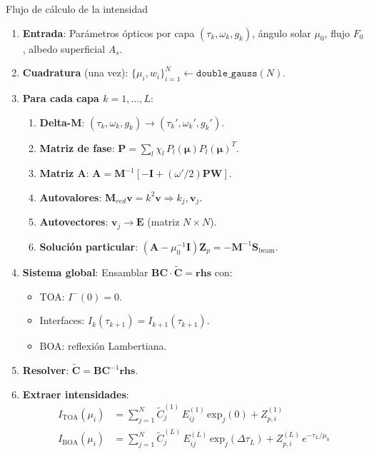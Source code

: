 \documentclass[a4paper,11pt]{article}
\begin{document}
\begin{concept}{Flujo de c\'alculo de la intensidad}
\begin{enumerate}
\item \textbf{Entrada}: Par\'ametros \'opticos por capa $(\tau_k, \omega_k, g_k)$, \'angulo solar $\mu_0$, flujo $F_0$, albedo superficial $A_s$.

\item \textbf{Cuadratura} (una vez): $\{\mu_i, w_i\}_{i=1}^{N} \leftarrow \texttt{double\_gauss}(N)$.

\item \textbf{Para cada capa $k = 1, \ldots, L$}:
\begin{enumerate}
\item[(3a)] \textbf{Delta-M}: $(\tau_k, \omega_k, g_k) \to (\tau_k', \omega_k', g_k')$.
\item[(3b)] \textbf{Matriz de fase}: $\mathbf{P} = \sum_l \chi_l \, P_l(\bm{\mu}) P_l(\bm{\mu})^T$.
\item[(3c)] \textbf{Matriz $\mathbf{A}$}: $\mathbf{A} = \mathbf{M}^{-1}[-\mathbf{I} + (\omega'/2)\mathbf{P}\mathbf{W}]$.
\item[(3d)] \textbf{Autovalores}: $\mathbf{M}_{red}\mathbf{v} = k^2\mathbf{v} \Rightarrow k_j, \mathbf{v}_j$.
\item[(3e)] \textbf{Autovectores}: $\mathbf{v}_j \to \mathbf{E}$ (matriz $N \times N$).
\item[(3f)] \textbf{Soluci\'on particular}: $(\mathbf{A} - \mu_0^{-1}\mathbf{I})\mathbf{Z}_p = -\mathbf{M}^{-1}\mathbf{S}_{\text{beam}}$.
\end{enumerate}

\item \textbf{Sistema global}: Ensamblar $\mathbf{BC} \cdot \widetilde{\mathbf{C}} = \mathbf{rhs}$ con:
\begin{itemize}
\item TOA: $I^{-}(0) = 0$.
\item Interfaces: $I_k(\tau_{k+1}) = I_{k+1}(\tau_{k+1})$.
\item BOA: reflexi\'on Lambertiana.
\end{itemize}

\item \textbf{Resolver}: $\widetilde{\mathbf{C}} = \mathbf{BC}^{-1}\mathbf{rhs}$.

\item \textbf{Extraer intensidades}:
\begin{align}
I_{\text{TOA}}(\mu_i) &= \sum_{j=1}^{N} \widetilde{C}_j^{(1)} \, E_{ij}^{(1)} \, \text{exp}_j(0) + Z_{p,i}^{(1)} \\
I_{\text{BOA}}(\mu_i) &= \sum_{j=1}^{N} \widetilde{C}_j^{(L)} \, E_{ij}^{(L)} \, \text{exp}_j(\Delta\tau_L) + Z_{p,i}^{(L)} \, e^{-\tau_L/\mu_0}
\end{align}
\end{enumerate}
\end{concept}
\end{document}
